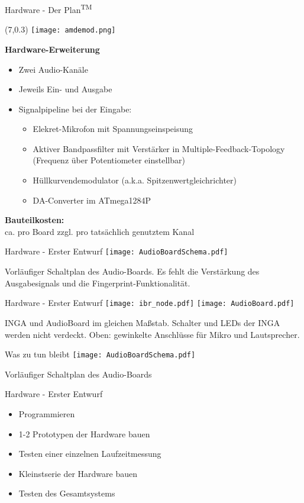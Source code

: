 \documentclass[fleqn,11pt]{beamer}
\begin{document}
\begin{frame}{Hardware - Der Plan\textsuperscript{\small{TM}}}
\begin{textblock}{7}(7,0.3)
\texttt{[image: amdemod.png]}
\end{textblock}
\vspace*{1.2cm}
	\textbf{Hardware-Erweiterung}
	\begin{itemize}
		\item Zwei Audio-Kanäle
		\item Jeweils Ein- und Ausgabe
		\item Signalpipeline  bei der Eingabe:
		\begin{itemize}
			\item Elekret-Mikrofon mit Spannungseinspeisung
			\item Aktiver Bandpassfilter mit Verstärker in Multiple-Feedback-Topology \\(Frequenz über Potentiometer einstellbar) 
			\item Hüllkurvendemodulator (a.k.a. Spitzenwertgleichrichter)
			\item DA-Converter im ATmega1284P
		\end{itemize}
	\end{itemize}
	\textbf{Bauteilkosten:}\\ ca.  pro Board zzgl.  pro tatsächlich genutztem Kanal
\end{frame}


\begin{frame}{Hardware - Erster Entwurf}
	\texttt{[image: AudioBoardSchema.pdf]}
	
	Vorläufiger Schaltplan des Audio-Boards. Es fehlt die Verstärkung des Ausgabesignals und die Fingerprint-Funktionalität.
\end{frame}

\begin{frame}{Hardware - Erster Entwurf}
	\texttt{[image: ibr\_node.pdf]}
	\texttt{[image: AudioBoard.pdf]}
	
	INGA und AudioBoard im gleichen Maßstab. Schalter und LEDs der INGA werden nicht verdeckt. Oben: gewinkelte Anschlüsse für Mikro und Lautsprecher.
\end{frame}


\begin{frame}{Was zu tun bleibt}
	\texttt{[image: AudioBoardSchema.pdf]}
	
	Vorläufiger Schaltplan des Audio-Boards
\end{frame}

\begin{frame}{Hardware - Erster Entwurf}
	\begin{itemize}
		\item Programmieren
		\item 1-2 Prototypen der Hardware bauen
		\item Testen einer einzelnen Laufzeitmessung
		\item Kleinstserie der Hardware bauen
		\item Testen des Gesamtsystems
	\end{itemize}
\end{frame}
\end{document}
